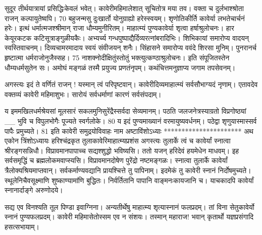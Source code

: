 सुदूर तीर्थयात्रायां प्रसिद्धिःकेवलं भवेत्।
 कावेरीमहिमालेशात् सूचितोत्र मया तव।
 वक्ता च दुर्लभाश्श्रोता राजन् कल्पायुतेष्वपि।
 70 बहुजन्मसु दुःखार्तो योनुग्राह्यो हरेस्स्वयम्।
 शृणोतिकीर्ति कावेर्या लभतेचार्चनं हरेः।
 इत्थं धर्मात्मजश्श्रीमान् राजा धौम्यमुनीरितम्।
 माहात्म्यं पुण्यकावेर्या शृत्वा हर्षाश्रुलोचनः।
 हार केयूरकटक कटिसूत्राङ्गुळीयकैः।
 अभ्यर्च्य गन्धपुष्पाद्यैर्दिव्यरत्नांबरादिभिः।
 शिभिकायां समारोप्य वादयन् स्वस्तिवाचनम्।
 दिव्यचामरमादाय स्वयं संवीजयन् शनैः।
 सिंहासने समारोप्य ववंदे शिरसा मुनिम्।
 पुनरानर्च हृष्टात्मा धर्मराजोनुजैस्सह।
 75 नाशक्नोदीक्षितुंस्तोतुं भक्त्युत्कण्ठाश्रुलोचनः।
 इति संपूजितस्तेन धौम्यधर्मसुतेन सः।
 अमोघं मङ्गळं तस्मै प्रयुज्य प्रणतंनृपम्।
 कथंचित्तमनुज्ञाप्य जगाम तपसेवनम्।
 
अगस्त्यः
इदं ते वर्णितं राजन् ! यस्मान् त्वं परिपृष्टवान्।
 कावेरीदिव्यमाहात्म्यं सर्वसौभाग्यदं नृणाम्।
 एतावदेव वक्तव्यं कावेरी महिमाशुभः।
 सारोयं सर्वधर्माणां कारणं सर्वसंपदाम्।
 
य इममखिलधर्मश्रेयसां मूलसारं
सकलमुनिसुरेंद्रैस्सर्वदा सेव्यमानम्।
 पठति जलजनेत्रस्याग्रतो विप्रगोष्ठ्यां __ भुवि च विपुलभोगैः पूज्यते स्वर्गलोके।
 80 य इदं पुण्यमाख्यानं वरमायुष्यवर्धनम्।
 पठेद्वा शृणुयास्मास्सर्व पापैः प्रमुच्यते।
 81 इति कावेरी समुद्रयोविवाहः नाम अष्टाविंशोऽध्याः
**********************
अथ एकोन त्रिंशोऽध्यायः हरिश्चंद्रकृत तुलाकावेरिमाहात्म्यप्रशंस
अगस्त्यः
तुलार्के त्वं च कावेर्यां स्नात्वा श्रीरङ्गसन्निधौ।
 विप्रावमानपापाच्च सद्यश्शुद्धो भविष्यसि।
 ततो यजन् हरिदेवं हयमेधेन माधवम्।
 इह सर्वसमृद्धिं च ब्रह्मलोकमवाप्स्यसि।
 विप्रावमानदोषेण पुरेंद्रो नष्टमङ्गळः।
 स्नात्वा तुलार्के कावेर्यां त्रैलोक्यश्रियमाप्तवान्।
 सर्वकर्माण्यवद्यानि प्रायश्चित्ते तु पापिनाम्।
 इदमेकं तु कावेरी स्नानं निर्दोषमुच्यते।
 स्थूलेनिचैवसूक्ष्माणि शुष्काण्यामा॑णि बुद्धितः।
 निर्वर्तितानि पापानि वाङ्मनःकायजानि च।
 याचकादपि कावेर्यां स्नानार्दाङ्गे अरुणोदये।
 
सद्य एव विनश्यति तूल पिण्डा इवाग्निना।
 अन्यतीर्थेषु माहात्म्य शृत्यास्नानं फलप्रदम्।
 तां विना सेतुकावेर्यो स्नानं पुण्यफलप्रदम्।
 कावेरी महिमासेतोस्सम एव न संशयः।
 तस्मान् महाराज! भवान् कृतार्थो यज्ञप्रसंगादि
हसत्सभायाम्।

